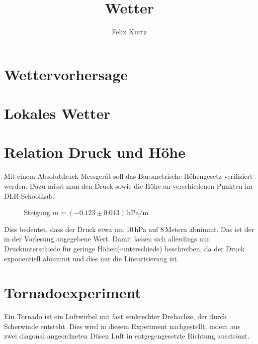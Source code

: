 \documentclass[12pt,a4paper,headinclude,bibtotoc]{scrartcl}
\begin{document}
\title{Wetter}
\author{Felix Kurtz}
\maketitle

\section{Wettervorhersage}

\section{Lokales Wetter}

\section{Relation Druck und Höhe}
Mit einem Absolutdruck-Messgerät soll das Barometrische Höhengesetz verifiziert werden.
Dazu misst man den Druck sowie die Höhe an verschiedenen Punkten im DLR-SchoolLab.
\begin{figure}[!htb]
	\centering
	
	\caption{Steigung $m=(-0.123 \pm 0.013)\,\si{\hecto\pascal\per\meter}$}
	\label{fig:druckHoehe}
\end{figure}

Dies bedeutet, dass der Druck etwa um $10\,$hPa auf $8\,$Metern abnimmt.
Das ist der in der Vorlesung angegebene Wert.
Damit lassen sich allerdings nur Druckunterschiede für geringe Höhen(-unterschiede) beschreiben, da der Druck exponentiell abnimmt und dies nur die Linearisierung ist.

\section{Tornadoexperiment}
Ein Tornado ist ein Luftwirbel mit fast senkrechter Drehachse, der durch Scherwinde entsteht.
Dies wird in diesem Experiment nachgestellt, indem aus zwei diagonal angeordneten Düsen Luft in entgegengesetzte Richtung ausströmt.
\end{document}
